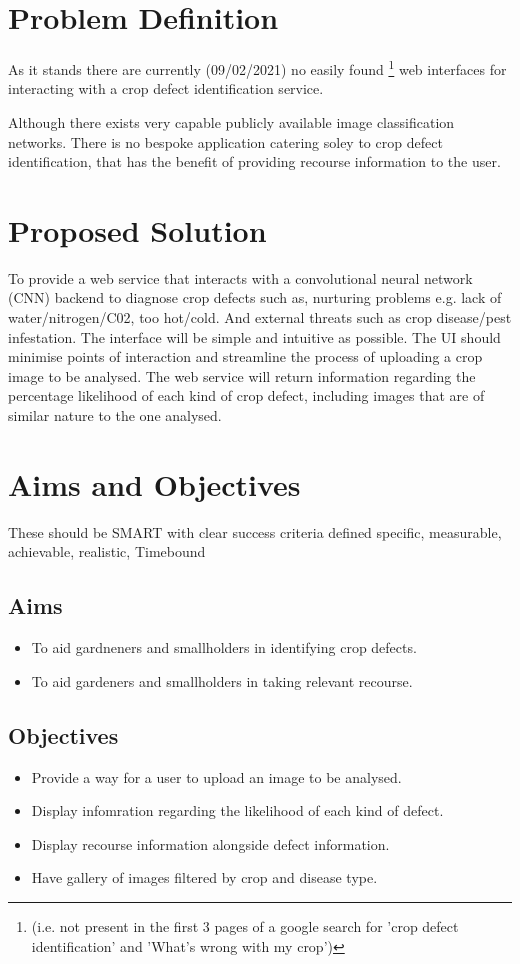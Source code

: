 \section{Problem Definition}
  As it stands there are currently (09/02/2021) no easily found \footnote[1]{(i.e. not present in the first 3 pages of a google search for 'crop defect identification' and 'What's wrong with my crop')} web interfaces for interacting with a crop defect identification service.
  \par
  Although there exists very capable publicly available image classification networks. \cite{Yandex} There is no bespoke application catering soley to crop defect identification, that has the benefit of providing recourse information to the user.

\section{Proposed Solution}
  To provide a web service that interacts with a convolutional neural network (CNN) backend to diagnose crop defects such as, nurturing problems e.g. lack of water/nitrogen/C02, too hot/cold. And external threats such as crop disease/pest infestation. The interface will be simple and intuitive as possible. The UI should minimise points of interaction and streamline the process of uploading a crop image to be analysed.
	The web service will return information regarding the percentage likelihood of each kind of crop defect, including images that are of similar nature to the one analysed.

\section{Aims and Objectives}
  These should be SMART with clear success criteria defined
  specific, measurable, achievable, realistic, Timebound
  \subsection{Aims}
    \begin{itemize}
      \item To aid gardneners and smallholders in identifying crop defects.
      \item To aid gardeners and smallholders in taking relevant recourse.
    \end{itemize}
  \subsection{Objectives}
    \begin{itemize}
      \item Provide a way for a user to upload an image to be analysed.
      \item Display infomration regarding the likelihood of each kind of defect.
      \item Display recourse information alongside defect information.
      \item Have gallery of images filtered by crop and disease type.
    \end{itemize}

